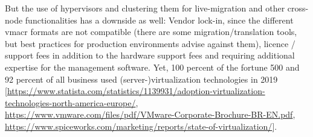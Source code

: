 \newline
But the use of hypervisors and clustering them for live-migration and other cross-node functionalities has a downside as well: Vendor lock-in, since the different \gls{vmacr} formats are not compatible (there are some migration/translation tools, but best practices for production environments advise against them), licence / support fees in addition to the hardware support fees and requiring additional expertise for the management software.
\newline
Yet, 100 percent of the fortune 500 and 92 percent of all business used (server-)virtualization technologies in 2019 [\url{https://www.statista.com/statistics/1139931/adoption-virtualization-technologies-north-america-europe/}, \url{https://www.vmware.com/files/pdf/VMware-Corporate-Brochure-BR-EN.pdf}, \url{https://www.spiceworks.com/marketing/reports/state-of-virtualization/}].



%





